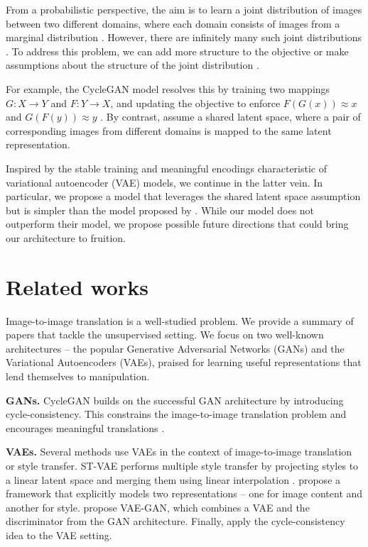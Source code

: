 \documentclass{article}
\begin{document}
From a probabilistic perspective, the aim is to learn a joint distribution of images between two different domains, where each domain consists of images from a marginal distribution \citep{liu}. However, there are infinitely many such joint distributions \citep{liu}. To address this problem, we can add more structure to the objective \citep{zhu} or make assumptions about the structure of the joint distribution \citep{liu}.

For example, the CycleGAN model resolves this by training two mappings $G: X \rightarrow Y$ and $F: Y \rightarrow X$, and updating the objective to enforce $F(G(x)) \approx x$ and $G(F(y)) \approx y$ \citep{zhu}. By contrast, \citet{liu} assume a shared latent space, where a pair of corresponding images from different domains is mapped to the same latent representation.

Inspired by the stable training and meaningful encodings characteristic of variational autoencoder (VAE) models, we continue in the latter vein. In particular, we propose a model that leverages the shared latent space assumption but is simpler than the model proposed by \citet{liu}. While our model does not outperform their model, we propose possible future directions that could bring our architecture to fruition.

\section{Related works}
Image-to-image translation is a well-studied problem. We provide a summary of papers that tackle the unsupervised setting. We focus on two well-known architectures – the popular Generative Adversarial Networks (GANs) and the Variational Autoencoders (VAEs), praised for learning useful representations that lend themselves to manipulation.

\textbf{GANs.} CycleGAN builds on the successful GAN architecture by introducing cycle-consistency. This constrains the image-to-image translation problem and encourages meaningful translations \citep{zhu}.

\textbf{VAEs.} Several methods use VAEs in the context of image-to-image translation or style transfer. ST-VAE performs multiple style transfer by projecting styles to a linear latent space and merging them using linear interpolation \citep{liu2}. \citet{kazemi} propose a framework that explicitly models two representations – one for image content and another for style. \citet{larsen} propose VAE-GAN, which combines a VAE and the discriminator from the GAN architecture. Finally, \citet{jha} apply the cycle-consistency idea to the VAE setting.
\end{document}
